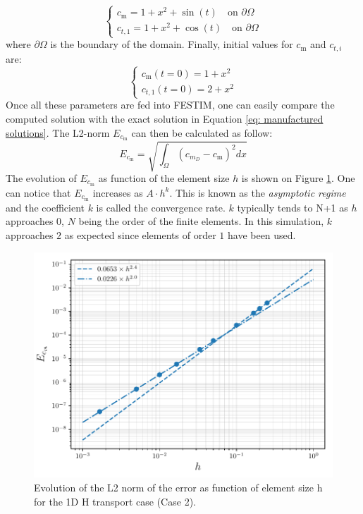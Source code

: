 \begin{equation}
    \begin{cases}
    c_\mathrm{m} = 1 + x^2 + \sin(t) \quad \text{on } \partial \Omega \\
    c_{t,1} = 1 + x^2 + \cos(t) \quad \text{on } \partial \Omega 
    \end{cases}
\end{equation}
where $\partial\Omega$ is the boundary of the domain.
Finally, initial values for $c_\mathrm{m}$ and $c_{t,i}$ are:
\begin{equation}
    \begin{cases}
    c_\mathrm{m}(t=0) = 1 + x^2 \\
    c_{t,1}(t=0) = 2 + x^2
    \end{cases}
\end{equation}
Once all these parameters are fed into FESTIM, one can easily compare the computed solution with the exact solution in Equation \ref{eq: manufactured solutions}.
The L2-norm $E_{c_\mathrm{m}}$ can then be calculated as follow:
\begin{equation}
    E_{c_\mathrm{m}} = \sqrt{\int_\Omega(c_{m_D} - c_\mathrm{m})^2dx}
\end{equation}
The evolution of $E_{c_\mathrm{m}}$ as function of the element size $h$ is shown on Figure \ref{fig:error vs h}.
One can notice that $E_{c_\mathrm{m}}$ increases as $A\cdot h^k$.
This is known as the \textit{asymptotic regime} and the coefficient $k$ is called the convergence rate.
$k$ typically tends to N+1 as $h$ approaches $0$, $N$ being the order of the finite elements.
In this simulation, $k$ approaches $2$ as expected since elements of order $1$ have been used.

\begin{figure}
    \centering
    \includegraphics[width=1\linewidth]{"Figures/Chapter3/L2 error on Cm vs h"}
    \caption{Evolution of the L2 norm of the error as function of element size h for the 1D H transport case (Case 2).}
    \label{fig:error vs h}
\end{figure}

